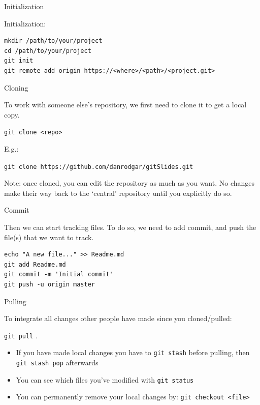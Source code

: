 \documentclass{beamer}
\begin{document}
\begin{frame}[fragile]{Initialization}

Initialization:

\begin{verbatim}
mkdir /path/to/your/project
cd /path/to/your/project
git init
git remote add origin https://<where>/<path>/<project.git>
\end{verbatim} 

\end{frame}

\begin{frame}{Cloning}

To work with someone else’s repository, we first need to clone it to get a
local copy.

\texttt{git clone <repo>}

E.g.:

\texttt{git clone https://github.com/danrodgar/gitSlides.git}

Note: once cloned, you can edit the repository as much as you want. No changes make their way back to the ‘central’ repository until you explicitly do so.

\end{frame}


\begin{frame}[fragile]{Commit}

Then we can start tracking files. To do so, we need to add commit, and push the file(s) that we want to track.
%
\begin{verbatim}
echo "A new file..." >> Readme.md
git add Readme.md
git commit -m 'Initial commit'
git push -u origin master
\end{verbatim}

\end{frame}


\begin{frame}{Pulling}

To integrate all changes other people have made since you
cloned/pulled:

\texttt{git pull} .

\begin{itemize}
 \item If you have made local changes you have to \texttt{git stash} before
pulling, then \texttt{git stash pop} afterwards
\item You can see which files you've modified with \texttt{git status}
\item You can permanently remove your local changes by: \texttt{git
checkout <file>}
\end{itemize}

\end{frame}
\end{document}
